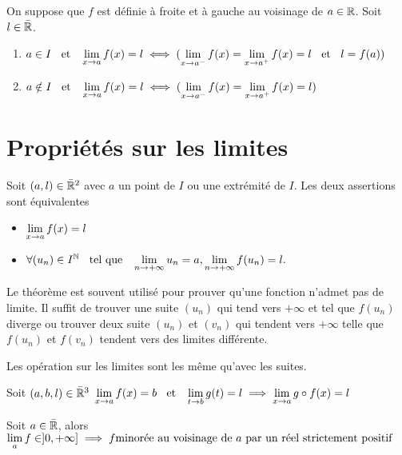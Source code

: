 \begin{prp} 
On suppose que $f$ est définie à froite et à gauche au voisinage de
$a \in \mathbb{R}$. Soit $l \in \bar{\mathbb{R}}$.
\begin{enumerate}
    \item $a \in I \;\;\text{ et }\;\; \lim\limits_{x \to a} f(x) = l \iff
    (\lim\limits_{x \to a^-} f(x) = \lim\limits_{x \to a^+} f(x) = l \;\;\text{ et }\;\; l = f(a))$
    \item $a \notin I \;\;\text{ et }\;\; \lim\limits_{x \to a} f(x) = l \iff
    (\lim\limits_{x \to a^-} f(x) = \lim\limits_{x \to a^+} f(x) = l)$
\end{enumerate}
\end{prp}

\section{Propriétés sur les limites}
\begin{thm}
Soit $(a, l) \in \bar{\mathbb{R}}^2$ avec $a$ un point de $I$ ou une extrémité
de $I$. Les deux assertions sont équivalentes
\begin{itemize}
    \item $\lim\limits_{x \to a} f(x) = l$ 
    \item $\forall (u_n) \in I^{\mathbb{N}} \;\;\text{ tel que }\;\; \lim\limits_{n \to +\infty} u_n = a,
    \lim\limits_{n \to +\infty} f(u_n) = l.$
\end{itemize}
\end{thm}

\begin{rem}
Le théorème est souvent utilisé pour prouver qu'une fonction n'admet pas
de limite.
Il suffit de trouver une suite $(u_n)$ qui tend vers $+\infty$ et tel
que $f(u_n)$ diverge ou trouver deux suite $(u_n)$ et $(v_n)$
qui tendent vers $+\infty$ telle que $f(u_n)$ et $f(v_n)$ tendent vers des
limites différente.
\end{rem}
 
\begin{rem}
Les opération sur les limites sont les même qu'avec les suites.
\end{rem}

\begin{prp} 
Soit $(a, b, l) \in \bar{\mathbb{R}}^3$
$\lim\limits_{x \to a} f(x) = b \;\;\text{ et }\;\; \lim\limits_{t \to b} g(t) = l
\implies \lim\limits_{x \to a} g \circ f(x) = l$
\end{prp}

\begin{prp} 
Soit $a \in \bar{\mathbb{R}}$, alors
$\lim\limits_{a} f \in ]0, +\infty] \implies f \text{minorée} \text{ au voisinage de }a
\text{ par un réel strictement positif}$
\end{prp}

